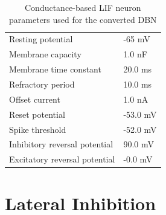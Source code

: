 \begin{table}[h!]
\caption{Conductance-based LIF neuron parameters used for the converted DBN}
\centering
\label{cobalifparam}
\begin{tabularx}{0.65\textwidth}{|XX|}
\hline
Resting potential    			& -65 mV 		    \\
Membrane capacity    			& 1.0 nF 		     \\
Membrane time constant    		& 20.0 ms		             \\
Refractory period     			& 10.0 ms		                 \\
Offset current    				& 1.0 nA		              \\
Reset potential     			& -53.0 mV 	               \\
Spike threshold     			& -52.0 mV          \\
Inhibitory reversal potential  & 90.0 mV	              \\
Excitatory reversal potential  & -0.0 mV 	               \\\hline
\end{tabularx}
\end{table}
   
\pagebreak   
   
\section{Lateral Inhibition}   
   
